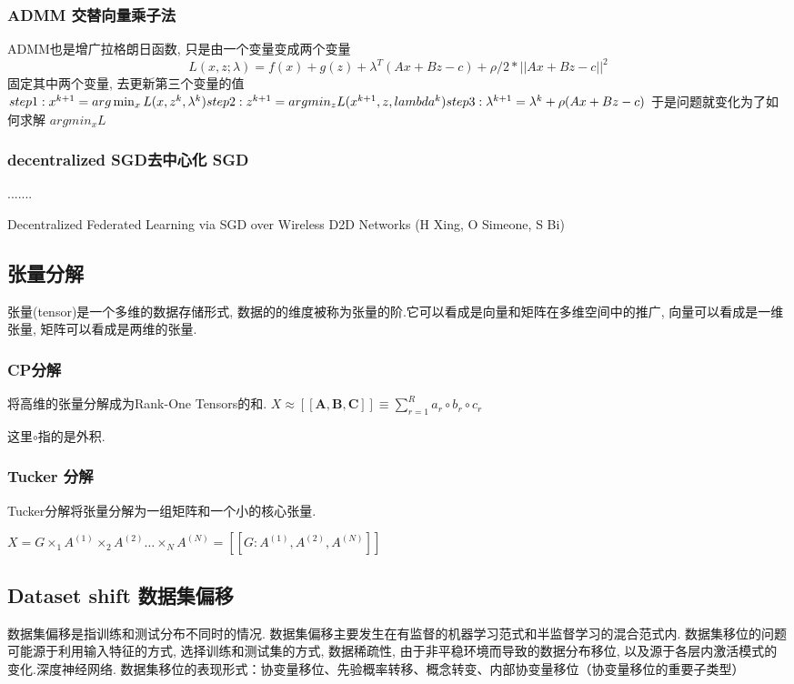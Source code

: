 \documentclass[a4paper]{article}
\theoremstyle{definition}
\numberwithin{equation}{section}
\begin{document}
\subsubsection{ADMM 交替向量乘子法}
ADMM也是增广拉格朗日函数, 只是由一个变量变成两个变量
$$L(x, z;\lambda)= f(x) + g(z) + \lambda ^T(Ax + Bz - c) + \rho/2 * ||Ax + Bz -c ||^2$$
固定其中两个变量, 去更新第三个变量的值
$step1: x^{k+1} = arg \min_x L(x, z^k, \lambda^k) \\
step2: z^{k+1} = arg min_z L(x^{k+1}, z, lambda^k) \\
step3: \lambda ^ {k+1} = \lambda^k + \rho (Ax + Bz - c) \\$
于是问题就变化为了如何求解 $arg min_x L$
\subsubsection{decentralized SGD去中心化 SGD}

.......

Decentralized Federated Learning via SGD over Wireless D2D Networks (H Xing,  O Simeone,  S Bi)

\subsection{张量分解}
张量(tensor)是一个多维的数据存储形式, 数据的的维度被称为张量的阶.它可以看成是向量和矩阵在多维空间中的推广, 向量可以看成是一维张量, 矩阵可以看成是两维的张量.
\subsubsection{CP分解}
将高维的张量分解成为Rank-One Tensors的和.
$X \approx [ \!  [ \mathbf{A, B, C} ]\!] \equiv \sum_{r=1}^{R}a_r \circ b_r \circ c_r$

这里$\circ$指的是外积.
\subsubsection{Tucker 分解  }

Tucker分解将张量分解为一组矩阵和一个小的核心张量.

 $X = G \times_1 A^{(1)} \times_2  A^{(2)} \dots \times_N A^{(N)}= [\! [  G:A^{(1)},  A^{(2)},  A^{(N)}   ] \! ] $

\subsection{Dataset shift 数据集偏移}
数据集偏移是指训练和测试分布不同时的情况.
数据集偏移主要发生在有监督的机器学习范式和半监督学习的混合范式内.
数据集移位的问题可能源于利用输入特征的方式, 选择训练和测试集的方式, 数据稀疏性, 由于非平稳环境而导致的数据分布移位, 以及源于各层内激活模式的变化.深度神经网络.
数据集移位的表现形式：协变量移位、先验概率转移、概念转变、内部协变量移位（协变量移位的重要子类型）
\end{document}
